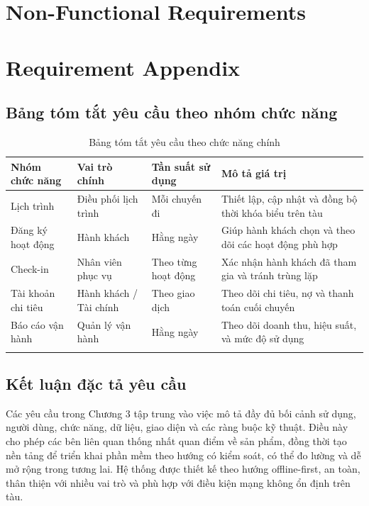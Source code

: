 

\section{Non-Functional Requirements}



\section{Requirement Appendix}


\subsection{Bảng tóm tắt yêu cầu theo nhóm chức năng}

\begin{longtable}{|p{3cm}|p{2.6cm}|p{2.8cm}|p{5cm}|}
\hline
\textbf{Nhóm chức năng} & \textbf{Vai trò chính} & \textbf{Tần suất sử dụng} & \textbf{Mô tả giá trị} \\
\hline
Lịch trình & Điều phối lịch trình & Mỗi chuyến đi & Thiết lập, cập nhật và đồng bộ thời khóa biểu trên tàu \\
\hline
Đăng ký hoạt động & Hành khách & Hằng ngày & Giúp hành khách chọn và theo dõi các hoạt động phù hợp \\
\hline
Check-in & Nhân viên phục vụ & Theo từng hoạt động & Xác nhận hành khách đã tham gia và tránh trùng lặp \\
\hline
Tài khoản chi tiêu & Hành khách / Tài chính & Theo giao dịch & Theo dõi chi tiêu, nợ và thanh toán cuối chuyến \\
\hline
Báo cáo vận hành & Quản lý vận hành & Hằng ngày & Theo dõi doanh thu, hiệu suất, và mức độ sử dụng \\
\hline
\caption{Bảng tóm tắt yêu cầu theo chức năng chính}
\end{longtable}

\subsection{Kết luận đặc tả yêu cầu}

Các yêu cầu trong Chương 3 tập trung vào việc mô tả đầy đủ bối cảnh sử dụng, người dùng, chức năng, dữ liệu, giao diện và các ràng buộc kỹ thuật. Điều này cho phép các bên liên quan thống nhất quan điểm về sản phẩm, đồng thời tạo nền tảng để triển khai phần mềm theo hướng có kiểm soát, có thể đo lường và dễ mở rộng trong tương lai. Hệ thống được thiết kế theo hướng offline-first, an toàn, thân thiện với nhiều vai trò và phù hợp với điều kiện mạng không ổn định trên tàu.

